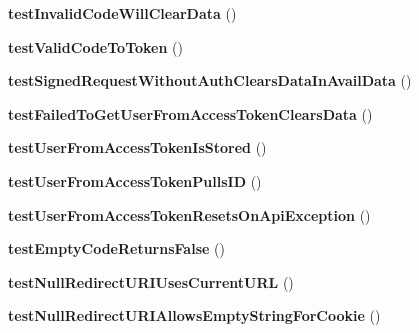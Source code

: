 \begin{DoxyCompactItemize}
\item 
\hypertarget{classPHPSDKTestCase_a324e200041a7237285e12f055bb05b97}{{\bfseries test\-Invalid\-Code\-Will\-Clear\-Data} ()}\label{classPHPSDKTestCase_a324e200041a7237285e12f055bb05b97}

\item 
\hypertarget{classPHPSDKTestCase_a415171dfef9b90c3317a29aa81d981b4}{{\bfseries test\-Valid\-Code\-To\-Token} ()}\label{classPHPSDKTestCase_a415171dfef9b90c3317a29aa81d981b4}

\item 
\hypertarget{classPHPSDKTestCase_a58a6a94f7b892cf498cb56d109a3e8c1}{{\bfseries test\-Signed\-Request\-Without\-Auth\-Clears\-Data\-In\-Avail\-Data} ()}\label{classPHPSDKTestCase_a58a6a94f7b892cf498cb56d109a3e8c1}

\item 
\hypertarget{classPHPSDKTestCase_a8cbb9e73d69d8326793b87e956ee451b}{{\bfseries test\-Failed\-To\-Get\-User\-From\-Access\-Token\-Clears\-Data} ()}\label{classPHPSDKTestCase_a8cbb9e73d69d8326793b87e956ee451b}

\item 
\hypertarget{classPHPSDKTestCase_a275c65f20ab70f77a560b058f7a4a55f}{{\bfseries test\-User\-From\-Access\-Token\-Is\-Stored} ()}\label{classPHPSDKTestCase_a275c65f20ab70f77a560b058f7a4a55f}

\item 
\hypertarget{classPHPSDKTestCase_a90488e16a9100181e384e3a90b74d2e2}{{\bfseries test\-User\-From\-Access\-Token\-Pulls\-I\-D} ()}\label{classPHPSDKTestCase_a90488e16a9100181e384e3a90b74d2e2}

\item 
\hypertarget{classPHPSDKTestCase_a3d11a2e9ebc35c201fd1ff17b12e938f}{{\bfseries test\-User\-From\-Access\-Token\-Resets\-On\-Api\-Exception} ()}\label{classPHPSDKTestCase_a3d11a2e9ebc35c201fd1ff17b12e938f}

\item 
\hypertarget{classPHPSDKTestCase_a55c23081626ba476a1993d93b947bcb0}{{\bfseries test\-Empty\-Code\-Returns\-False} ()}\label{classPHPSDKTestCase_a55c23081626ba476a1993d93b947bcb0}

\item 
\hypertarget{classPHPSDKTestCase_a993652db1ebfac3e8d5ba10341aabf6c}{{\bfseries test\-Null\-Redirect\-U\-R\-I\-Uses\-Current\-U\-R\-L} ()}\label{classPHPSDKTestCase_a993652db1ebfac3e8d5ba10341aabf6c}

\item 
\hypertarget{classPHPSDKTestCase_a000d6a8460620cded4c1b68f14cbed68}{{\bfseries test\-Null\-Redirect\-U\-R\-I\-Allows\-Empty\-String\-For\-Cookie} ()}\label{classPHPSDKTestCase_a000d6a8460620cded4c1b68f14cbed68}


\end{DoxyCompactItemize}
